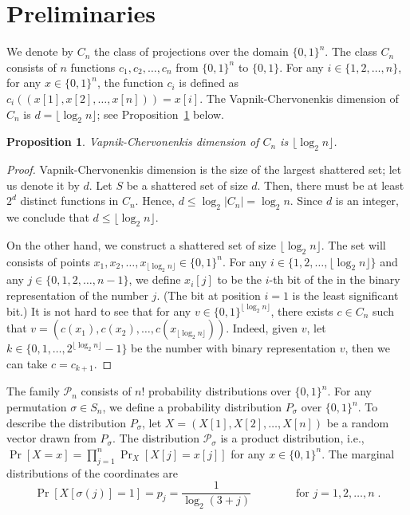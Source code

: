 \documentclass[10pt]{article}
\newtheorem{proposition}{Proposition}
\renewcommand{\P}{\mathcal{P}}
\begin{document}
\section{Preliminaries}

We denote by $C_n$ the class of projections over the domain $\{0,1\}^n$. The
class $C_n$ consists of $n$ functions $c_1, c_2, \dots, c_n$ from $\{0,1\}^n$ to
$\{0,1\}$. For any $i \in \{1,2,\dots,n\}$, for any $x \in \{0,1\}^n$,
the function $c_i$ is defined as $c_i((x[1], x[2], \dots, x[n])) = x[i]$.
The Vapnik-Chervonenkis dimension of $C_n$ is $d = \lfloor \log_2 n \rfloor$; see
Proposition~\ref{proposition:vc-dimension-projections} below.

\begin{proposition}
\label{proposition:vc-dimension-projections}
Vapnik-Chervonenkis dimension of $C_n$ is $\lfloor \log_2 n \rfloor$.
\end{proposition}

\begin{proof}
Vapnik-Chervonenkis dimension is the size of the largest shattered set; let us
denote it by $d$. Let $S$ be a shattered set of size $d$. Then, there must be at
least $2^d$ distinct functions in $C_n$. Hence, $d \le \log_2 |C_n| =
\log_2 n$. Since $d$ is an integer, we conclude that $d \le \lfloor \log_2 n
\rfloor$.

On the other hand, we construct a shattered set of size $\lfloor \log_2 n
\rfloor$. The set will consists of points $x_1, x_2, \dots, x_{\lfloor \log_2 n
\rfloor} \in \{0,1\}^n$. For any $i \in \{1,2,\dots,\lfloor \log_2 n \rfloor\}$
and any $j \in \{0,1,2,\dots,n-1\}$, we define $x_i[j]$ to be the $i$-th bit of the
in the binary representation of the number $j$. (The bit at position $i=1$ is the
least significant bit.) It is not hard to see that for any $v \in
\{0,1\}^{\lfloor \log_2 n \rfloor}$, there exists $c \in C_n$ such that $v =
(c(x_1), c(x_2), \dots, c(x_{\lfloor \log_2 n \rfloor}))$. Indeed, given $v$,
let $k \in \{0,1,\dots,2^{\lfloor \log_2 n \rfloor} - 1\}$ be the number with
binary representation $v$, then we can take $c = c_{k+1}$.
\end{proof}

The family $\P_n$ consists of $n!$ probability distributions over
$\{0,1\}^n$. For any permutation $\sigma \in S_n$, we define a probability distribution
$P_{\sigma}$ over $\{0,1\}^n$. To describe the distribution $P_\sigma$, let $X = (X[1],
X[2], \dots, X[n])$ be a random vector drawn from $P_\sigma$.
The distribution $\P_\sigma$ is a product distribution,
i.e., $\Pr[X = x] = \prod_{j=1}^n \Pr_{X}[X[j] = x[j]]$
for any $x \in \{0,1\}^n$. The marginal distributions
of the coordinates are
$$
\Pr[X[\sigma(j)] = 1] = p_j = \frac{1}{\log_2(3 + j)} \qquad \qquad \text{for $j=1,2,\dots,n$} \; .
$$
\end{document}
